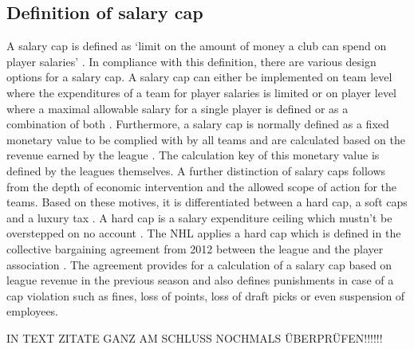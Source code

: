 \documentclass[12pt,a4paper]{article}\usepackage[]{graphicx}\usepackage[]{xcolor}
\begin{document}
\subsection{Definition of salary cap}

A salary cap is defined as ‘limit on the amount of money a club can spend on player salaries’ \citep[pg. ~1]{dietl_effect_2009}. In compliance with this definition, there are various design options for a salary cap. A salary cap can either be implemented on team level where the expenditures of a team for player salaries is limited or on player level where a maximal allowable salary for a single player is defined or as a combination of both \citep{llindholm_problem_2011}. Furthermore, a salary cap is normally defined as a fixed monetary value to be complied with by all teams and are calculated based on the revenue earned by the league \citep{dietl_effect_2009}. The calculation key of this monetary value is defined by the leagues themselves. A further distinction of salary caps follows from the depth of economic intervention and the allowed scope of action for the teams. Based on these motives, it is differentiated between a hard cap, a soft caps and a luxury tax \citep[see][]{levine_hard_1995, llindholm_problem_2011}. A hard cap is a salary expenditure ceiling which mustn’t be overstepped on no account \citep{levine_hard_1995}. The NHL applies a hard cap which is defined in the collective bargaining agreement from 2012 between the league and the player association \citep{noauthor_collective_2012}. The agreement provides for a calculation of a salary cap based on league revenue in the previous season and also defines punishments in case of a cap violation such as fines, loss of points, loss of draft picks or even suspension of employees. 





IN TEXT ZITATE GANZ AM SCHLUSS NOCHMALS ÜBERPRÜFEN!!!!!!



\end{document}

